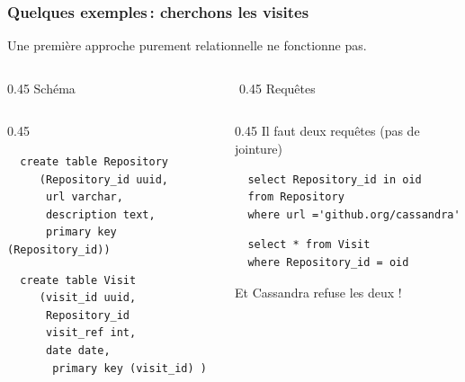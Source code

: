 \begin{frame}[fragile] \frametitle{Quelques exemples\,: cherchons les visites}

Une première approche purement relationnelle ne fonctionne pas.
\vfill

\begin{columns}
    \begin{column}{0.45\textwidth}
    \alert{Schéma}
    \end{column}
        \begin{column}{0.45\textwidth}
    \alert{Requêtes}
    \end{column}
\end{columns}

\begin{columns}
    \begin{column}{0.45\textwidth}
  \begin{verbatim}
  create table Repository 
     (Repository_id uuid,
      url varchar, 
      description text,
      primary key (Repository_id))
  \end{verbatim}
  
  \begin{verbatim}
  create table Visit 
     (visit_id uuid,
      Repository_id
      visit_ref int,
      date date,
       primary key (visit_id) )
  \end{verbatim}
  \end{column}
 \begin{column}{0.45\textwidth}
  Il faut deux requêtes (pas de jointure)
  \vfill
  \begin{verbatim}
  select Repository_id in oid 
  from Repository 
  where url ='github.org/cassandra'
  \end{verbatim}

  \begin{verbatim}
  select * from Visit 
  where Repository_id = oid
  \end{verbatim}
  \vfill
  Et Cassandra refuse les deux ! 
\end{column}
\end{columns}

\end{frame}


